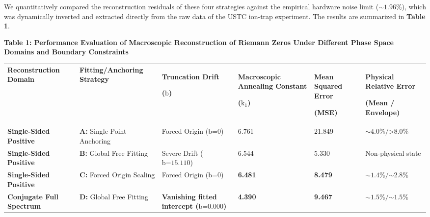 We quantitatively compared the reconstruction residuals of these four
strategies against the empirical hardware noise limit
(\(\text{∼1.96\%}\)), which was dynamically inverted and extracted
directly from the raw data of the USTC ion-trap experiment. The results
are summarized in \textbf{Table 1}.

\textbf{Table 1: Performance Evaluation of Macroscopic Reconstruction of
Riemann Zeros Under Different Phase Space Domains and Boundary
Constraints}

\begin{longtable}[]{@{}llllll@{}}
\toprule
\endhead
\begin{minipage}[t]{0.14\columnwidth}\raggedright
\textbf{Reconstruction Domain}\strut
\end{minipage} & \begin{minipage}[t]{0.14\columnwidth}\raggedright
\textbf{Fitting/Anchoring Strategy}\strut
\end{minipage} & \begin{minipage}[t]{0.14\columnwidth}\raggedright
\textbf{Truncation Drift}

\textbf{(}\(\text{b}\)\textbf{)}\strut
\end{minipage} & \begin{minipage}[t]{0.14\columnwidth}\raggedright
\textbf{Macroscopic Annealing Constant}

\textbf{(}\(\text{k}_{\text{1}}\)\textbf{)}\strut
\end{minipage} & \begin{minipage}[t]{0.14\columnwidth}\raggedright
\textbf{Mean Squared Error}

\textbf{(MSE)}\strut
\end{minipage} & \begin{minipage}[t]{0.14\columnwidth}\raggedright
\textbf{Physical Relative Error}

\textbf{(Mean / Envelope)}\strut
\end{minipage}\tabularnewline
\textbf{Single-Sided Positive} & \textbf{A:} Single-Point Anchoring &
Forced Origin (\(\text{b}\text{=0}\)) & 6.761 & 21.849 &
\(\text{∼4.0\%/>8.0\%}\)\tabularnewline
\textbf{Single-Sided Positive} & \textbf{B:} Global Free Fitting &
Severe Drift (\(\text{b}\text{=15.110}\)) & 6.544 & 5.330 & Non-physical
state\tabularnewline
\textbf{Single-Sided Positive} & \textbf{C:} Forced Origin Scaling &
Forced Origin (\(\text{b}\text{=0}\)) & \textbf{6.481} & \textbf{8.479}
& \(\text{∼1.4\%/∼2.8\%}\)\tabularnewline
\textbf{Conjugate Full Spectrum} & \textbf{D:} Global Free Fitting &
\textbf{Vanishing fitted intercept (}\(\text{b}\text{=0.000}\)\textbf{)} &
\textbf{4.390} & \textbf{9.467} &
\(\text{∼1.5\%/∼1.5\%}\)\tabularnewline
\bottomrule
\end{longtable}

